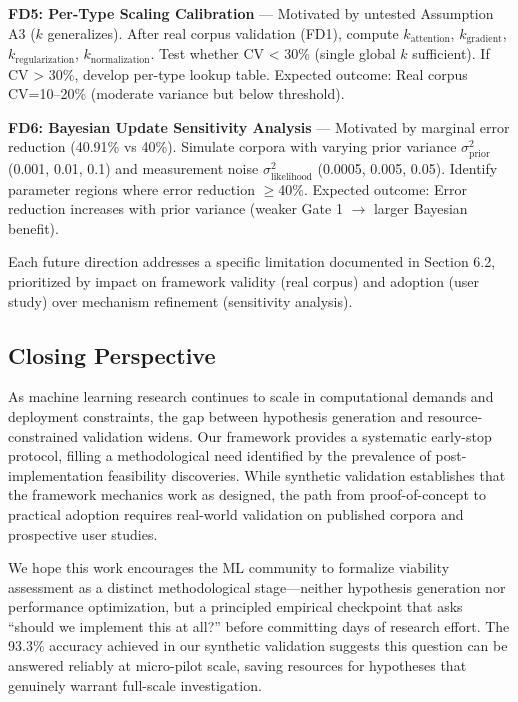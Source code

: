 \textbf{FD5: Per-Type Scaling Calibration} --- Motivated by untested Assumption A3 ($k$ generalizes). After real corpus validation (FD1), compute $k_{\text{attention}}$, $k_{\text{gradient}}$, $k_{\text{regularization}}$, $k_{\text{normalization}}$. Test whether CV < 30\% (single global $k$ sufficient). If CV > 30\%, develop per-type lookup table. Expected outcome: Real corpus CV=10--20\% (moderate variance but below threshold).

\textbf{FD6: Bayesian Update Sensitivity Analysis} --- Motivated by marginal error reduction (40.91\% vs 40\%). Simulate corpora with varying prior variance $\sigma^2_{\text{prior}}$ (0.001, 0.01, 0.1) and measurement noise $\sigma^2_{\text{likelihood}}$ (0.0005, 0.005, 0.05). Identify parameter regions where error reduction $\geq$40\%. Expected outcome: Error reduction increases with prior variance (weaker Gate 1 $\rightarrow$ larger Bayesian benefit).

Each future direction addresses a specific limitation documented in Section 6.2, prioritized by impact on framework validity (real corpus) and adoption (user study) over mechanism refinement (sensitivity analysis).

\subsection{Closing Perspective}

As machine learning research continues to scale in computational demands and deployment constraints, the gap between hypothesis generation and resource-constrained validation widens. Our framework provides a systematic early-stop protocol, filling a methodological need identified by the prevalence of post-implementation feasibility discoveries. While synthetic validation establishes that the framework mechanics work as designed, the path from proof-of-concept to practical adoption requires real-world validation on published corpora and prospective user studies.

We hope this work encourages the ML community to formalize viability assessment as a distinct methodological stage---neither hypothesis generation nor performance optimization, but a principled empirical checkpoint that asks ``should we implement this at all?'' before committing days of research effort. The 93.3\% accuracy achieved in our synthetic validation suggests this question can be answered reliably at micro-pilot scale, saving resources for hypotheses that genuinely warrant full-scale investigation.
